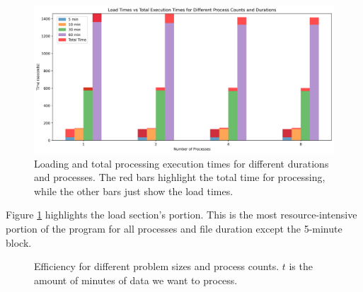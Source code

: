 \begin{figure}[!h]
    \centering
    \includegraphics[scale=0.50]{figures/judasex.png}
    \caption{Loading and total processing execution times for different durations and processes. The red bars highlight the total time for processing, while the other bars just show the load times.}
    \label{fig:judasextime}
\end{figure}

Figure \ref{fig:judasextime} highlights the load section's portion. This is the most resource-intensive portion of the program for all processes and file duration except the 5-minute block. 


\begin{figure}[!htbp]
\centering
{}
\caption{Efficiency for different problem sizes and process counts. $t$ is the amount of minutes of data we want to process.}
\label{fig:judasefficiency}
\end{figure}



